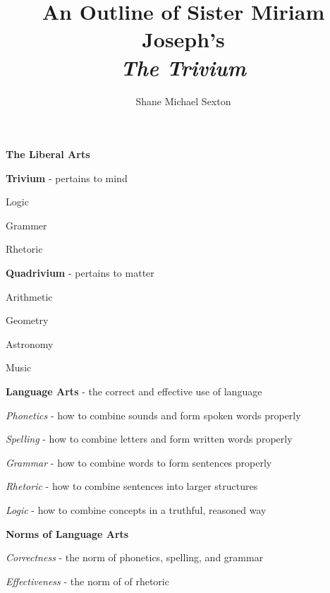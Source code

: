 \documentclass{report}
\begin{document}
\title{An Outline of Sister Miriam Joseph's\\\textit{The Trivium}}
\author{Shane Michael Sexton}

\maketitle

\begin{outline}
  \item {\bf The Liberal Arts}
  \begin{outline}
    \item {\bf Trivium} - pertains to mind
    \begin{outline}
       \item Logic
       \item Grammer
       \item Rhetoric
     \end{outline}
    \item {\bf Quadrivium} - pertains to matter
    \begin{outline}
       \item Arithmetic
       \item Geometry
       \item Astronomy
       \item Music
     \end{outline}
     \item {\bf Language Arts} - the correct and effective use of language
    \begin{outline}
       \item \textit{Phonetics} - how to combine sounds and form spoken words properly
       \item \textit{Spelling} - how to combine letters and form written words properly
       \item \textit{Grammar} - how to combine words to form sentences properly
       \item \textit{Rhetoric} - how to combine sentences into larger structures
       \item \textit{Logic} - how to combine concepts in a truthful, reasoned way
     \end{outline}
    \item {\bf Norms of Language Arts} 
    \begin{outline}
       \item \textit{Correctness} - the norm of phonetics, spelling, and grammar
       \item \textit{Effectiveness} - the norm of of rhetoric

\end{outline}
\end{outline}
\end{outline}
\end{document}
